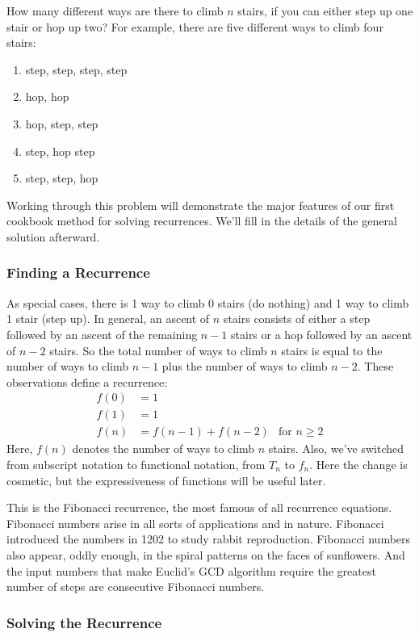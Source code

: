 How many different ways are there to climb $n$ stairs, if you can
either step up one stair or hop up two?  For example, there are five
different ways to climb four stairs:
\begin{enumerate}
\item step, step, step, step
\item hop, hop
\item hop, step, step
\item step, hop step
\item step, step, hop
\end{enumerate}

\noindent Working through this problem will demonstrate the major
features of our first cookbook method for solving recurrences.  We'll
fill in the details of the general solution afterward.

\subsubsection{Finding a Recurrence}

As special cases, there is 1 way to climb 0 stairs (do nothing) and 1
way to climb 1 stair (step up).  In general, an ascent of $n$ stairs
consists of either a step followed by an ascent of the remaining $n -
1$ stairs or a hop followed by an ascent of $n - 2$ stairs.  So the
total number of ways to climb $n$ stairs is equal to the number of
ways to climb $n-1$ plus the number of ways to climb $n-2$.  These
observations define a recurrence:
\begin{align*}
f(0) & = 1 \\
f(1) & = 1 \\
f(n) & = f(n-1) + f(n-2) & \text{for $n \geq 2$}
\end{align*}
Here, $f(n)$ denotes the number of ways to climb $n$ stairs.  Also,
we've switched from subscript notation to functional notation, from
$T_n$ to $f_n$.  Here the change is cosmetic, but the expressiveness
of functions will be useful later.

This is the Fibonacci recurrence, the most famous of all recurrence
equations.  Fibonacci numbers arise in all sorts of applications and
in nature. Fibonacci introduced the numbers in 1202 to study rabbit
reproduction. Fibonacci numbers also appear, oddly enough, in the
spiral patterns on the faces of sunflowers. And the input numbers that
make Euclid's GCD algorithm require the greatest number of steps are
consecutive Fibonacci numbers.

\subsubsection{Solving the Recurrence}

